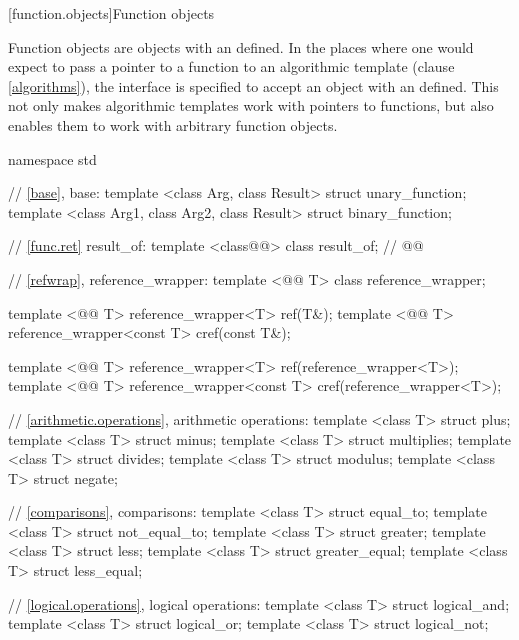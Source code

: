 \documentclass[american,twoside]{book}
\begin{document}
\setcounter{section}{4}
[function.objects]{Function objects}

\pnum
Function objects are objects with an  defined.
In the places where one would expect to pass a pointer to a function to an
algorithmic template (clause \ref{algorithms}), the interface is specified to accept an object with an
defined.
This not only makes algorithmic templates work with pointers to functions, but
also enables them to work with arbitrary function objects.

\pnum
{}
%

\begin{codeblock}
namespace std {
  // \ref{base}, base:
  template <class Arg, class Result> struct unary_function;
  template <class Arg1, class Arg2, class Result> struct binary_function;

  // \marktr{}\ref{func.ret} result_of:
  template <class@@> class result_of;   // 
  @@

  // \marktr{}\ref{refwrap}, reference_wrapper:
  template <@@ T> class reference_wrapper; 

  template <@@ T> reference_wrapper<T> ref(T&);
  template <@@ T> reference_wrapper<const T> cref(const T&);

  template <@@ T> reference_wrapper<T> ref(reference_wrapper<T>);
  template <@@ T> reference_wrapper<const T> cref(reference_wrapper<T>);

  //    \ref{arithmetic.operations}, arithmetic operations:
  template <class T> struct plus;
  template <class T> struct minus;
  template <class T> struct multiplies;
  template <class T> struct divides;
  template <class T> struct modulus;
  template <class T> struct negate;

  // \ref{comparisons}, comparisons:
  template <class T> struct equal_to;
  template <class T> struct not_equal_to;
  template <class T> struct greater;
  template <class T> struct less;
  template <class T> struct greater_equal;
  template <class T> struct less_equal;

  // \ref{logical.operations}, logical operations:
  template <class T> struct logical_and;
  template <class T> struct logical_or;
  template <class T> struct logical_not;

}
\end{codeblock}
\end{document}
